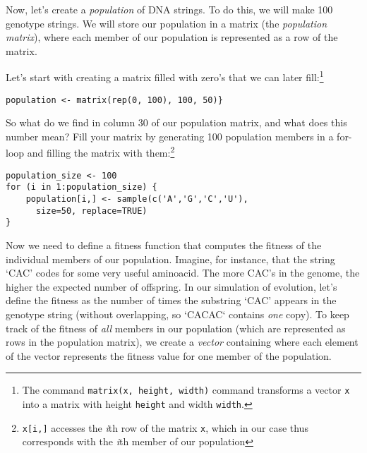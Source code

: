 \documentclass[a4paper, 9pt]{article}
\begin{document}
Now, let's create a \textit{population} of DNA strings. To do this, we
will make 100 genotype strings.
We will store our population in a matrix (the \textit{population matrix}), where each member of our population is represented as a row of the matrix. 

\begin{exercise}
\action Let's start with creating a matrix filled with zero's that we can later fill:\footnote{The command \texttt{matrix(x, height, width)} command transforms a vector \texttt{x} into a matrix with height \texttt{height} and width \texttt{width}.} 
  \begin{lstlisting}
population <- matrix(rep(0, 100), 100, 50)}
\end{lstlisting}
  So what do we find in column 30 of our population matrix, and what does this number mean?
  \action Fill your matrix by generating 100 population members in a for-loop and filling the matrix with them:\footnote{\texttt{x[i,]} accesses the \textit{i}th row of the matrix \texttt{x}, which in our case thus corresponds with the \textit{i}th member of our population}
  \begin{lstlisting}
population_size <- 100
for (i in 1:population_size) {
    population[i,] <- sample(c('A','G','C','U'), 
      size=50, replace=TRUE)
}
    \end{lstlisting}
\end{exercise}

Now we need to define a fitness function that computes the fitness of
the individual members of our population. Imagine, for instance, that
the string `CAC' codes for some very useful aminoacid. The more CAC's in
the genome, the higher the expected number of offspring. In our
simulation of evolution, let's define the fitness as the number of times
the substring `CAC' appears in the genotype string (without overlapping, so `CACAC` contains \emph{one} copy).
To keep track of the fitness of \textit{all} members in our population
(which are represented as rows in the population matrix), we create a
\textit{vector} containing where each element of the vector represents
the fitness value for one member of the population.
\end{document}
